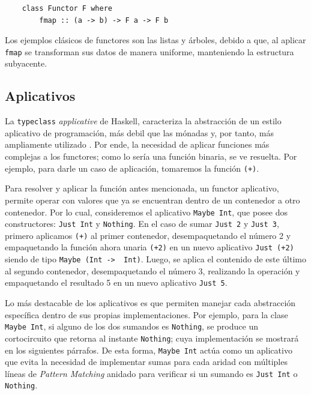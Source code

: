 \newpage

\begin{verbatim}
    class Functor F where
        fmap :: (a -> b) -> F a -> F b
\end{verbatim}


Los ejemplos clásicos de functores son las listas y árboles, debido a que, al aplicar \texttt{fmap} se transforman sus datos de manera uniforme, manteniendo la estructura subyacente.

\subsection{Aplicativos}

La \verb|typeclass| \textit{applicative} de \textsf{Haskell}, caracteriza la abstracción de un estilo aplicativo de programación, más debil que las mónadas y, por tanto, más ampliamente utilizado \cite{McBride2008}. Por ende, la necesidad de aplicar funciones más complejas a los functores; como lo sería una función binaria, se ve resuelta. Por ejemplo, para darle un caso de aplicación, tomaremos la función \texttt{(+)}.  

Para resolver y aplicar la función antes mencionada, un functor aplicativo, permite operar con valores que ya se encuentran dentro de un contenedor a otro contenedor. Por lo cual, consideremos el aplicativo \texttt{Maybe Int}, que posee dos constructores: \texttt{Just Int} y \texttt{Nothing}. En el caso de sumar \texttt{Just 2} y \texttt{Just 3}, primero aplicamos \texttt{(+)} al primer contenedor, desempaquetando el número 2 y empaquetando la función ahora unaria \texttt{(+2)} en un nuevo aplicativo \texttt{Just (+2)} siendo de tipo \texttt{Maybe (Int -> \ Int)}. Luego, se aplica el contenido de este último al segundo contenedor, desempaquetando el número 3, realizando la operación y empaquetando el resultado 5 en un nuevo aplicativo \texttt{Just 5}. 

Lo más destacable de los aplicativos es que permiten manejar cada abstracción específica dentro de sus propias implementaciones. Por ejemplo, para la clase \verb|Maybe Int|, si alguno de los dos sumandos es \texttt{Nothing}, se produce un cortocircuito que retorna al instante \texttt{Nothing}; cuya implementación se mostrará en los siguientes párrafos. De esta forma, \texttt{Maybe Int} actúa como un aplicativo que evita la necesidad de implementar sumas para cada aridad con múltiples líneas de \textit{Pattern Matching} anidado para verificar si un sumando es \texttt{Just Int} o \texttt{Nothing}.

